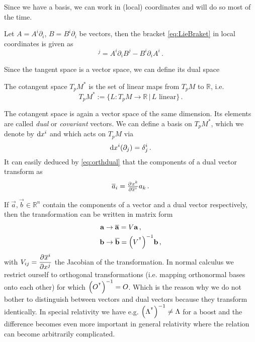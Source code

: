 Since we have a basis, we can work in (local) coordinates and will do so most of
the time.
\begin{example}
Let $A=A^i\partial_i$, $B=B^i\partial_i$ be vectors, then the  bracket
\eqref{eq:LieBraket} in local coordinates is given as
\begin{equation}
    [A,B]^j=A^i\partial_iB^j-B^i\partial_iA^i\, .
\end{equation}
\end{example}
Since the tangent space is a vector space, we can define its dual space
\begin{definition} The cotangent space $T_pM^*$ is the set of
linear maps from $T_pM$ to $\mathbb{R}$, i.e.
\begin{equation}
    T_pM^*:=\{L:T_pM\to \mathbb{R}\, |\, L \text{ linear}\}\, .
\end{equation}
\end{definition}
The cotangent space is again a vector space of the same dimension. Its elements
are called \emph{dual} or \emph{covariant} vectors.
We can define a basis on $	T_pM^*$, which we denote by $\dif x^i$ and  which acts on $T_pM$ via
\begin{equation}
    \dif x^i(\partial_j)=\delta^i_j\, . \label{eq:orthdual}
\end{equation}
It can easily deduced by \eqref{eq:orthdual} that the components of a dual vector transform as
\begin{equation}
    \overline{a}_i=\pd{x^k}{{\overline{x}^i}}a_k\, .
\end{equation}
\begin{remark}
If $\vec{a},\vec{b}\in\mathbb{R}^n$ contain the components of a vector and a
dual vector respectively, then the transformation can be written in matrix form
\begin{align}
    \vec{a}&\to\overline{\vec{a}}= V\vec{a}\, ,\\
    \vec{b}&\to\overline{\vec{b}}=\left(V\transpose\right)^{-1}\vec{b}\, ,
\end{align}
with $V_{ij}=\dpd{\overline{x}^i}{{x^j}}$ the
Jacobian of the transformation.
In normal calculus we restrict ourself to orthogonal transformations (i.e.
mapping orthonormal bases onto each other) for which
$\left(O\transpose\right)^{-1}=O$.
Which is the reason why we do not bother to distinguish between vectors and dual vectors because they transform identically. 
In special relativity we have e.g.
$\left(\Lambda\transpose\right)^{-1}\neq\Lambda$ for a boost and the difference
becomes even more important in general relativity where the relation can become arbitrarily complicated.
\end{remark}
